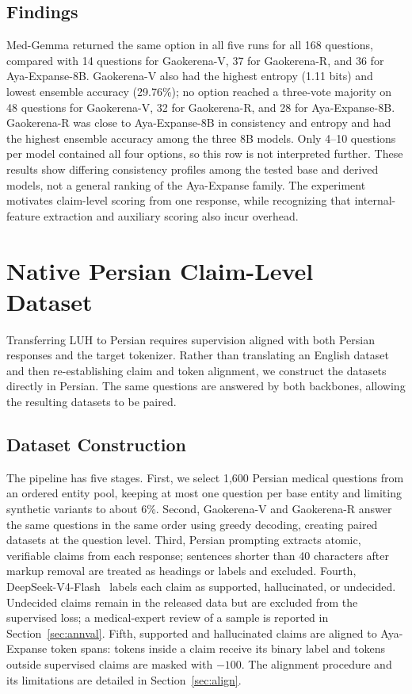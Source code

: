 \documentclass[conference,a4paper]{IEEEtran}
\begin{document}
\subsection{Findings}

Med-Gemma returned the same option in all five runs for all 168 questions, compared with 14 questions for Gaokerena-V, 37 for Gaokerena-R, and 36 for Aya-Expanse-8B. Gaokerena-V also had the highest entropy (1.11 bits) and lowest ensemble accuracy (29.76\%); no option reached a three-vote majority on 48 questions for Gaokerena-V, 32 for Gaokerena-R, and 28 for Aya-Expanse-8B. Gaokerena-R was close to Aya-Expanse-8B in consistency and entropy and had the highest ensemble accuracy among the three 8B models. Only 4--10 questions per model contained all four options, so this row is not interpreted further. These results show differing consistency profiles among the tested base and derived models, not a general ranking of the Aya-Expanse family. The experiment motivates claim-level scoring from one response, while recognizing that internal-feature extraction and auxiliary scoring also incur overhead.

\section{Native Persian Claim-Level Dataset}

Transferring LUH to Persian requires supervision aligned with both Persian responses and the target tokenizer. Rather than translating an English dataset and then re-establishing claim and token alignment, we construct the datasets directly in Persian. The same questions are answered by both backbones, allowing the resulting datasets to be paired.

\subsection{Dataset Construction}

The pipeline has five stages. First, we select 1,600 Persian medical questions from an ordered entity pool, keeping at most one question per base entity and limiting synthetic variants to about 6\%. Second, Gaokerena-V and Gaokerena-R answer the same questions in the same order using greedy decoding, creating paired datasets at the question level. Third, Persian prompting extracts atomic, verifiable claims from each response; sentences shorter than 40 characters after markup removal are treated as headings or labels and excluded. Fourth, DeepSeek-V4-Flash~\cite{b13} labels each claim as supported, hallucinated, or undecided. Undecided claims remain in the released data but are excluded from the supervised loss; a medical-expert review of a sample is reported in Section~\ref{sec:annval}. Fifth, supported and hallucinated claims are aligned to Aya-Expanse token spans: tokens inside a claim receive its binary label and tokens outside supervised claims are masked with $-100$. The alignment procedure and its limitations are detailed in Section~\ref{sec:align}.
\end{document}
